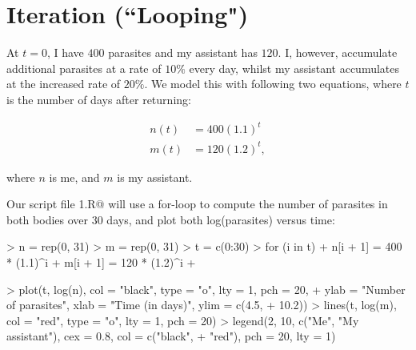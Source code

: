 \documentclass[11pt, oneside, reqno]{article}
\begin{document}
\eans

\section{Iteration (``Looping")}

At $t=0$, I have $400$ parasites and my assistant has $120$. I, however, accumulate additional parasites at a rate of $10\%$ every day, whilst my assistant accumulates at the increased rate of $20\%$. We model this with following two equations, where $t$ is the number of days after returning:

\begin{align*}
n(t)&=400(1.1)^t\\
m(t)&=120(1.2)^t,
\end{align*}

where $n$ is me, and $m$ is my assistant. 

Our script file \verb@Parasite1.R@ will use a for-loop to compute the number of parasites in both bodies over 30 days, and plot both log(parasites) versus time:

\begin{Schunk}
\begin{Sinput}
> n = rep(0, 31)
> m = rep(0, 31)
> t = c(0:30)
> for (i in t) {
+     n[i + 1] = 400 * (1.1)^i
+     m[i + 1] = 120 * (1.2)^i
+ }
\end{Sinput}
\end{Schunk}

\begin{Schunk}
\begin{Sinput}
> plot(t, log(n), col = "black", type = "o", lty = 1, pch = 20, 
+     ylab = "Number of parasites", xlab = "Time (in days)", ylim = c(4.5, 
+         10.2))
> lines(t, log(m), col = "red", type = "o", lty = 1, pch = 20)
> legend(2, 10, c("Me", "My assistant"), cex = 0.8, col = c("black", 
+     "red"), pch = 20, lty = 1)
\end{Sinput}
\end{Schunk}
\end{document}
